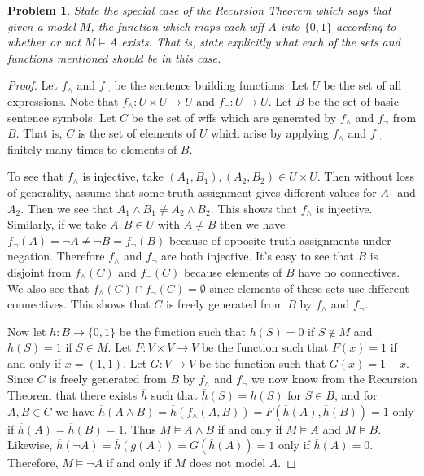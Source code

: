 \documentclass{article}
\newtheorem{problem}{Problem}
\begin{document}
\begin{problem}
State the special case of the Recursion Theorem which says that given a model $M$, the function which maps each wff $A$ into $\{0, 1\}$ according to whether or not $M \models A$ exists. That is, state explicitly what each of the sets and functions mentioned should be in this case.
\end{problem}
\begin{proof}
Let $f_{\wedge}$ and $f_{\neg}$ be the sentence building functions. Let $U$ be the set of all expressions. Note that $f_{\wedge} : U \times U \to U$ and $f_{\neg} : U \to U$. Let $B$ be the set of basic sentence symbols. Let $C$ be the set of wffs which are generated by $f_{\wedge}$ and $f_{\neg}$ from $B$. That is, $C$ is the set of elements of $U$ which arise by applying $f_{\wedge}$ and $f_{\neg}$ finitely many times to elements of $B$.

To see that $f_{\wedge}$ is injective, take $(A_1, B_1), (A_2,B_2) \in U \times U$. Then without loss of generality, assume that some truth assignment gives different values for $A_1$ and $A_2$. Then we see that $A_1 \wedge B_1 \neq A_2 \wedge B_2$. This shows that $f_{\wedge}$ is injective. Similarly, if we take $A, B \in U$ with $A \neq B$ then we have $f_{\neg}(A) = \neg A \neq \neg B = f_{\neg}(B)$ because of opposite truth assignments under negation. Therefore $f_{\wedge}$ and $f_{\neg}$ are both injective. It's easy to see that $B$ is disjoint from $f_{\wedge}(C)$ and $f_{\neg}(C)$ because elements of $B$ have no connectives. We also see that $f_{\wedge}(C) \cap f_{\neg}(C) = \emptyset$ since elements of these sets use different connectives. This shows that $C$ is freely generated from $B$ by $f_{\wedge}$ and $f_{\neg}$.

Now let $h : B \to \{0, 1\}$ be the function such that $h(S) = 0$ if $S \notin M$ and $h(S) = 1$ if $S \in M$. Let $F : V \times V \to V$ be the function such that $F(x) = 1$ if and only if $x = (1,1)$. Let $G : V \to V$ be the function such that $G(x) = 1 - x$. Since $C$ is freely generated from $B$ by $f_{\wedge}$ and $f_{\neg}$ we now know from the Recursion Theorem that there exists $\overline{h}$ such that $\overline{h}(S) = h(S)$ for $S \in B$, and for $A, B \in C$ we have $\overline{h}(A \wedge B) = \overline{h}(f_{\wedge}(A, B)) = F(\overline{h}(A), \overline{h}(B)) = 1$ only if $\overline{h}(A) = \overline{h}(B) = 1$. Thus $M \models A \wedge B$ if and only if $M \models A$ and $M \models B$. Likewise, $\overline{h}(\neg A) = \overline{h}(g(A)) = G(\overline{h}(A)) = 1$ only if $\overline{h}(A) = 0$. Therefore, $M \models \neg A$ if and only if $M$ does not model $A$.
\end{proof}
\end{document}
